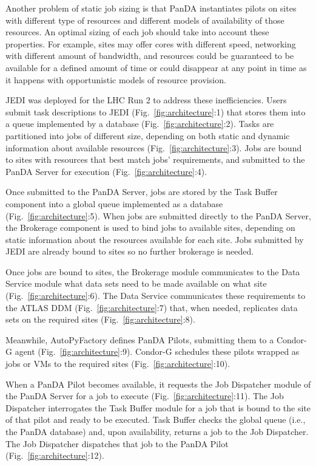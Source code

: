 \documentclass[conference]{IEEEtran}
\begin{document}
Another problem of static job sizing is that PanDA instantiates pilots on sites
with different type of resources and different models of availability of those
resources. An optimal sizing of each job should take into account these
properties. For example, sites may offer cores with different speed, networking
with different amount of bandwidth, and resources could be guaranteed to be
available for a defined amount of time or could disappear at any point in time
as it happens with opportunistic models of resource provision.

JEDI was deployed for the LHC Run 2 to address these inefficiencies. Users
submit task descriptions to JEDI (Fig.~\ref{fig:architecture}:1) that stores
them into a queue implemented by a database (Fig.~\ref{fig:architecture}:2).
Tasks are partitioned into jobs of different size, depending on both static and
dynamic information about available resources (Fig.~\ref{fig:architecture}:3).
Jobs are bound to sites with resources that best match jobs' requirements, and
submitted to the PanDA Server for execution (Fig.~\ref{fig:architecture}:4).

Once submitted to the PanDA Server, jobs are stored by the Task Buffer component
into a global queue implemented as a database (Fig.~\ref{fig:architecture}:5).
When jobs are submitted directly to the PanDA Server, the Brokerage component is
used to bind jobs to available sites, depending on static information about the
resources available for each site. Jobs submitted by JEDI are already bound to
sites so no further brokerage is needed.

Once jobs are bound to sites, the Brokerage module communicates to the Data
Service module what data sets need to be made available on what site
(Fig.~\ref{fig:architecture}:6). The Data Service communicates these
requirements to the ATLAS DDM (Fig.~\ref{fig:architecture}:7) that, when needed,
replicates data sets on the required sites (Fig.~\ref{fig:architecture}:8).

Meanwhile, AutoPyFactory defines PanDA Pilots, submitting them to a Condor-G
agent (Fig.~\ref{fig:architecture}:9). Condor-G schedules these pilots wrapped
as jobs or VMs to the required sites (Fig.~\ref{fig:architecture}:10).

When a PanDA Pilot becomes available, it requests the Job Dispatcher module of
the PanDA Server for a job to execute (Fig.~\ref{fig:architecture}:11). The Job
Dispatcher interrogates the Task Buffer module for a job that is bound to the
site of that pilot and ready to be executed. Task Buffer checks the global queue
(i.e., the PanDA database) and, upon availability, returns a job to the Job
Dispatcher. The Job Dispatcher dispatches that job to the PanDA Pilot
(Fig.~\ref{fig:architecture}:12).
\end{document}
